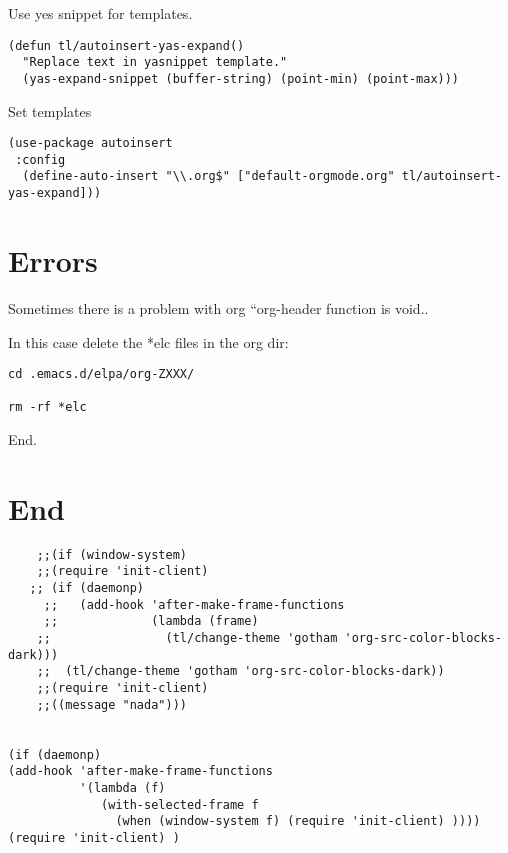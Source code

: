 \documentclass[12pt]{article}
\begin{document}
Use yes snippet for templates. 

\lstset{language=Lisp,label= ,caption= ,numbers=none}
\begin{lstlisting}
(defun tl/autoinsert-yas-expand()
  "Replace text in yasnippet template."
  (yas-expand-snippet (buffer-string) (point-min) (point-max)))
\end{lstlisting}

Set templates

\lstset{language=Lisp,label= ,caption= ,numbers=none}
\begin{lstlisting}
(use-package autoinsert 
 :config
  (define-auto-insert "\\.org$" ["default-orgmode.org" tl/autoinsert-yas-expand]))
\end{lstlisting}

\section{Errors}
\label{sec-11}

Sometimes there is a problem with org ``org-header function is void..

In this case delete the *elc files in the org dir:

\begin{verbatim}
cd .emacs.d/elpa/org-ZXXX/

rm -rf *elc
\end{verbatim}


End. 

\section{End}
\label{sec-12}

\lstset{language=Lisp,label= ,caption= ,numbers=none}
\begin{lstlisting}
    ;;(if (window-system)
    ;;(require 'init-client) 
   ;; (if (daemonp)
     ;;   (add-hook 'after-make-frame-functions
     ;;             (lambda (frame)
    ;;                (tl/change-theme 'gotham 'org-src-color-blocks-dark)))
    ;;  (tl/change-theme 'gotham 'org-src-color-blocks-dark))
    ;;(require 'init-client)
    ;;((message "nada"))) 


(if (daemonp)
(add-hook 'after-make-frame-functions
          '(lambda (f)
             (with-selected-frame f
               (when (window-system f) (require 'init-client) ))))
(require 'init-client) )
\end{lstlisting}
\end{document}
